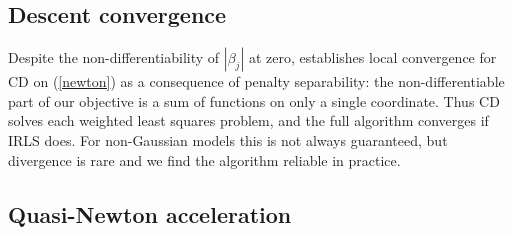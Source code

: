 \documentclass[12pt]{article}
\newcommand{\bs}[1]{\boldsymbol{#1}}
\newcommand{\mr}[1]{\mathrm{#1}}
\newcommand{\bm}[1]{\mathbf{#1}}
\begin{document}
\vspace{.25cm}


\subsection{Descent convergence}

 Despite the non-differentiability of $|\beta_j|$ at zero,
\citet{tseng_convergence_2001} establishes local convergence for CD on
(\ref{newton}) as a consequence of penalty separability: the 
non-differentiable part of our objective is a sum of functions on only a single
coordinate.  Thus CD solves each weighted least squares problem, and  the full
algorithm converges if IRLS does.  For non-Gaussian models this is not always
guaranteed, but divergence is rare and we find the algorithm reliable in
practice.

\subsection{Quasi-Newton acceleration}
\label{qn}
\end{document}
